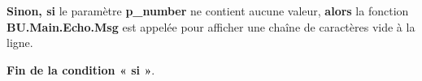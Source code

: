\documentclass[a4paper,10pt]{article}
\begin{document}
    \begin{justify}
        \textbf{\color{cond}Sinon, si} le paramètre \textbf{\color{vars}p\_number} ne contient aucune valeur, \textbf{\color{cond}alors} la fonction \textbf{\color{func}BU.Main.Echo.Msg} est appelée pour afficher une chaîne de caractères vide à la ligne.
    \end{justify}

    \begin{justify}
        \textbf{\color{cond}Fin de la condition « si »}.
    \end{justify}




\end{document}
